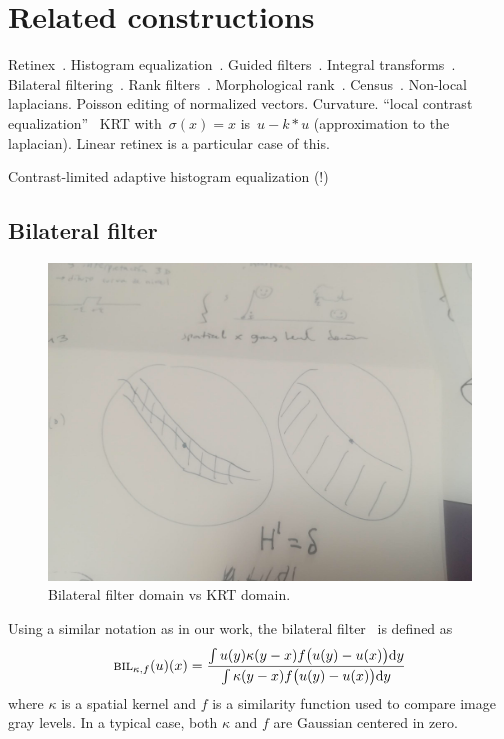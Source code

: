 \documentclass[12pt]{article}                  %
\begin{document}
\section{Related constructions}

Retinex~\cite{land1971lightness,land1977retinex,land1985recent,kimmel2003variational,provenzi2005mathematical,morel2010pde,petro2014multiscale}.
Histogram equalization~\cite{pizer1987adaptive,abdullah2007dynamic}.
Guided filters~\cite{he2012guided}.
Integral transforms~\cite{bradley2007adaptive}.
Bilateral filtering~\cite{tomasi1998bilateral,durand2002fast,paris2009bilateral}.
Rank filters~\cite{rankfilters1985}.
Morphological rank~\cite{soille2002morphological}.
Census~\cite{ZW,stein2004efficient,whycensus2013}.
Non-local laplacians.
Poisson editing of normalized vectors.
Curvature.
``local contrast equalization''~\cite{sapiro1997histogram}
KRT with~$\sigma(x)=x$ is~$u-k*u$ (approximation to the laplacian).  Linear
retinex is a particular case of this.

Contrast-limited adaptive histogram equalization (!)

\subsection{Bilateral filter}

\begin{figure}[t]
	\begin{center}
		\includegraphics[width=0.7\linewidth]{f/bilateral-vs-krt.jpg}
	\end{center}
	\caption{\label{fig:bilateral-vs-krt}
	Bilateral filter domain vs KRT domain.
	}
\end{figure}

Using a similar notation as in our work, the bilateral
filter~\cite{tomasi1998bilateral,durand2002fast,paris2009bilateral} is defined
as
\begin{equation}\label{eq:bilateral}
\textsc{bil}_{\kappa,f}(u)(x) =
\frac{\int u(y) \kappa(y-x) f\big(u(y)-u(x)\big) \mathrm{d} y}
     {\int \kappa(y-x) f\big(u(y)-u(x)\big) \mathrm{d} y}
\end{equation}
where $\kappa$ is a spatial kernel and $f$ is a similarity function used to
compare image gray levels.  In a typical case, both $\kappa$ and $f$ are
Gaussian centered in zero.
\end{document}
